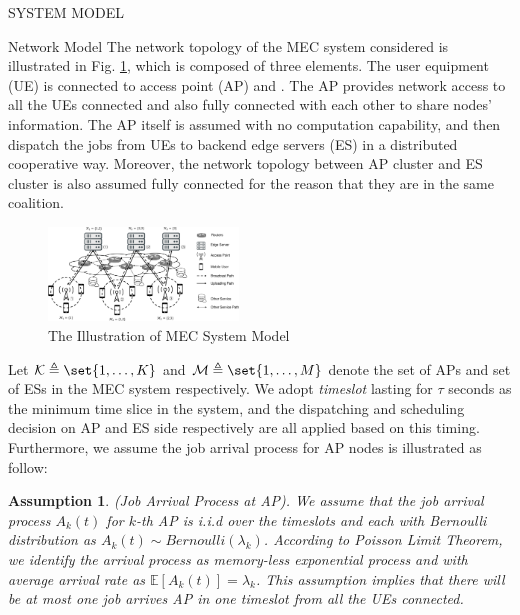 \documentclass[10pt, conference, letterpaper]{IEEEtran}
\newtheorem{assumption}{Assumption}
\DeclarePairedDelimiter\set\{\}
\begin{document}
    \begin{section}{SYSTEM MODEL}
        \label{sec:model}
        \begin{subsection}{Network Model}
            The network topology of the MEC system considered is illustrated in Fig. \ref{fig:system}, which is composed of three elements. The user equipment (UE) is connected to access point (AP) and . The AP provides network access to all the UEs connected and also fully connected with each other to share nodes' information. The AP itself is assumed with no computation capability, and then dispatch the jobs from UEs to backend edge servers (ES) in a distributed cooperative way. Moreover, the network topology between AP cluster and ES cluster is also assumed fully connected for the reason that they are in the same coalition.
            \begin{figure}[ht]
                \centering
                \includegraphics[width=0.45\textwidth, trim={0.5cm 0.5cm 0.5cm 0.5cm}, clip]{system-model.pdf}
                \caption{The Illustration of MEC System Model}
                \label{fig:system}
            \end{figure}

            Let $\mathcal{K} \triangleq \set{1,\dots,K}$ and $\mathcal{M} \triangleq \set{1,\dots,M}$ denote the set of APs and set of ESs in the MEC system respectively. We adopt \emph{timeslot} lasting for $\tau$ seconds as the minimum time slice in the system, and the dispatching and scheduling decision on AP and ES side respectively are all applied based on this timing. Furthermore, we assume the job arrival process for AP nodes is illustrated as follow:
            \begin{assumption}
                (Job Arrival Process at AP).
                We assume that the job arrival process $A_k(t)$ for $k$-th AP is i.i.d over the timeslots and each with Bernoulli distribution as $A_k(t) \sim Bernoulli(\lambda_k)$.  According to Poisson Limit Theorem, we identify the arrival process as memory-less exponential process and with average arrival rate as $\mathbb{E}[A_k(t)] = \lambda_k$.
                This assumption implies that there will be at most one job arrives AP in one timeslot from all the UEs connected.
            \end{assumption}


\end{subsection}
\end{section}
\end{document}
